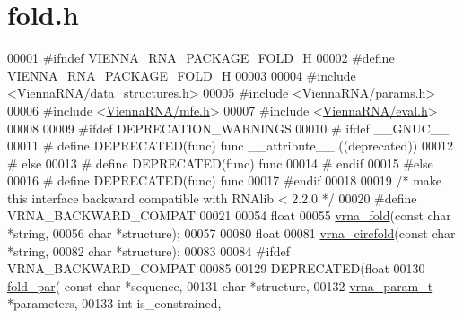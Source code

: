 \hypertarget{fold_8h_source}{}\section{fold.\+h}
\label{fold_8h_source}

\begin{DoxyCode}
00001 \textcolor{preprocessor}{#ifndef VIENNA\_RNA\_PACKAGE\_FOLD\_H}
00002 \textcolor{preprocessor}{#define VIENNA\_RNA\_PACKAGE\_FOLD\_H}
00003 
00004 \textcolor{preprocessor}{#include <\hyperlink{data__structures_8h}{ViennaRNA/data\_structures.h}>}
00005 \textcolor{preprocessor}{#include <\hyperlink{params_8h}{ViennaRNA/params.h}>}
00006 \textcolor{preprocessor}{#include <\hyperlink{mfe_8h}{ViennaRNA/mfe.h}>}
00007 \textcolor{preprocessor}{#include <\hyperlink{eval_8h}{ViennaRNA/eval.h}>}
00008 
00009 \textcolor{preprocessor}{#ifdef DEPRECATION\_WARNINGS}
00010 \textcolor{preprocessor}{# ifdef \_\_GNUC\_\_}
00011 \textcolor{preprocessor}{#  define DEPRECATED(func) func \_\_attribute\_\_ ((deprecated))}
00012 \textcolor{preprocessor}{# else}
00013 \textcolor{preprocessor}{#  define DEPRECATED(func) func}
00014 \textcolor{preprocessor}{# endif}
00015 \textcolor{preprocessor}{#else}
00016 \textcolor{preprocessor}{# define DEPRECATED(func) func}
00017 \textcolor{preprocessor}{#endif}
00018 
00019 \textcolor{comment}{/* make this interface backward compatible with RNAlib < 2.2.0 */}
00020 \textcolor{preprocessor}{#define VRNA\_BACKWARD\_COMPAT}
00021 
00054 \textcolor{keywordtype}{float}
00055 \hyperlink{group__mfe__fold__single_gae7ca49ffb3086f145da36c964a7cec64}{vrna\_fold}(\textcolor{keyword}{const} \textcolor{keywordtype}{char} *\textcolor{keywordtype}{string},
00056           \textcolor{keywordtype}{char} *structure);
00057 
00080 \textcolor{keywordtype}{float}
00081 \hyperlink{group__mfe__fold__single_gaa0f5bf321038f404b36a6147bdae4154}{vrna\_circfold}(\textcolor{keyword}{const} \textcolor{keywordtype}{char} *\textcolor{keywordtype}{string},
00082               \textcolor{keywordtype}{char} *structure);
00083 
00084 \textcolor{preprocessor}{#ifdef  VRNA\_BACKWARD\_COMPAT}
00085 
00129 DEPRECATED(\textcolor{keywordtype}{float}
00130 \hyperlink{group__mfe__fold__single_ga2bc41df5d71fee6fd8da9904ee65d8fb}{fold\_par}( \textcolor{keyword}{const} \textcolor{keywordtype}{char} *sequence,
00131           \textcolor{keywordtype}{char} *structure,
00132           \hyperlink{group__energy__parameters_structvrna__param__s}{vrna\_param\_t} *parameters,
00133           \textcolor{keywordtype}{int} is\_constrained,

\end{DoxyCode}
